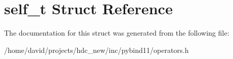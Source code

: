 \hypertarget{structself__t}{}\section{self\+\_\+t Struct Reference}
\label{structself__t}


The documentation for this struct was generated from the following file\+:\begin{DoxyCompactItemize}
\item 
/home/david/projects/hdc\+\_\+new/inc/pybind11/operators.\+h\end{DoxyCompactItemize}
